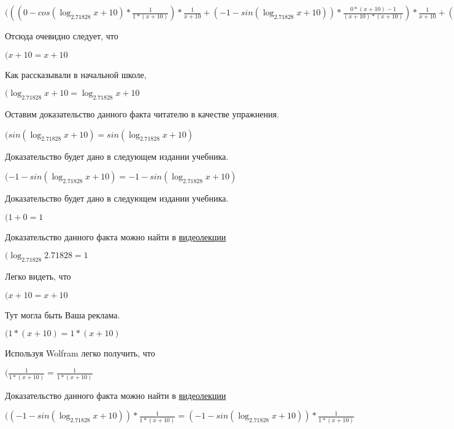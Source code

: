 \documentclass[12pt,a4paper,fleqn]{article}
\theoremstyle{definition}
\begin{document}
$((( 0  - cos(\log_{ 2.71828 }{ x  +  10 }) * \frac{ 1 }{ 1  * ( x  +  10 )}
) * \frac{ 1 }{ x  +  10 }
 + ( -1  - sin(\log_{ 2.71828 }{ x  +  10 })) * \frac{ 0  * ( x  +  10 ) -  1 }{( x  +  10 ) * ( x  +  10 )}
) * \frac{ 1 }{ x  +  10 }
 + ( -1  - sin(\log_{ 2.71828 }{ x  +  10 })) * \frac{ 1 }{ x  +  10 }
 * \frac{ 0  * ( x  +  10 ) -  1 }{( x  +  10 ) * ( x  +  10 )}
 = (( 0  - cos(\log_{ 2.71828 }{ x  +  10 }) * \frac{ 1 }{ 1  * ( x  +  10 )}
) * \frac{ 1 }{ x  +  10 }
 + ( -1  - sin(\log_{ 2.71828 }{ x  +  10 })) * \frac{ 0  * ( x  +  10 ) -  1 }{( x  +  10 ) * ( x  +  10 )}
) * \frac{ 1 }{ x  +  10 }
 + ( -1  - sin(\log_{ 2.71828 }{ x  +  10 })) * \frac{ 1 }{ x  +  10 }
 * \frac{ 0  * ( x  +  10 ) -  1 }{( x  +  10 ) * ( x  +  10 )}
$

Отсюда очевидно следует, что

$( x  +  10  =  x  +  10 $

Как рассказывали в начальной школе,

$(\log_{ 2.71828 }{ x  +  10 } = \log_{ 2.71828 }{ x  +  10 }$

Оставим доказательство данного факта читателю в качестве упражнения.

$(sin(\log_{ 2.71828 }{ x  +  10 }) = sin(\log_{ 2.71828 }{ x  +  10 })$

Доказательство будет дано в следующем издании учебника.

$( -1  - sin(\log_{ 2.71828 }{ x  +  10 }) =  -1  - sin(\log_{ 2.71828 }{ x  +  10 })$

Доказательство будет дано в следующем издании учебника.

$( 1  +  0  =  1 $

Доказательство данного факта можно найти в \href{https://www.youtube.com/watch?v=dQw4w9WgXcQ}{видеолекции}

$(\log_{ 2.71828 }{ 2.71828 } =  1 $

Легко видеть, что

$( x  +  10  =  x  +  10 $

Тут могла быть Ваша реклама.

$( 1  * ( x  +  10 ) =  1  * ( x  +  10 )$

Используя Wolfram легко получить, что

$(\frac{ 1 }{ 1  * ( x  +  10 )}
 = \frac{ 1 }{ 1  * ( x  +  10 )}
$

Доказательство данного факта можно найти в \href{https://www.youtube.com/watch?v=dQw4w9WgXcQ}{видеолекции}

$(( -1  - sin(\log_{ 2.71828 }{ x  +  10 })) * \frac{ 1 }{ 1  * ( x  +  10 )}
 = ( -1  - sin(\log_{ 2.71828 }{ x  +  10 })) * \frac{ 1 }{ 1  * ( x  +  10 )}
$
\end{document}
